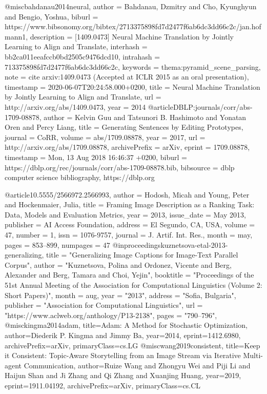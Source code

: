 @misc{bahdanau2014neural,
  author = {Bahdanau, Dzmitry and Cho, Kyunghyun and Bengio, Yoshua},
  biburl = {https://www.bibsonomy.org/bibtex/2713375898fd7d2477f6ab6dc3dd66c2c/jan.hofmann1},
  description = {[1409.0473] Neural Machine Translation by Jointly Learning to Align and Translate},
  interhash = {bb2ca011eeafccb0bd2505c9476dcd10},
  intrahash = {713375898fd7d2477f6ab6dc3dd66c2c},
  keywords = {thema:pyramid_scene_parsing},
  note = {cite arxiv:1409.0473 (Accepted at ICLR 2015 as an oral presentation)},
  timestamp = {2020-06-07T20:24:58.000+0200},
  title = {Neural Machine Translation by Jointly Learning to Align and Translate},
  url = {http://arxiv.org/abs/1409.0473},
  year = 2014
}
@article{DBLP:journals/corr/abs-1709-08878,
  author    = {Kelvin Guu and
               Tatsunori B. Hashimoto and
               Yonatan Oren and
               Percy Liang},
  title     = {Generating Sentences by Editing Prototypes},
  journal   = {CoRR},
  volume    = {abs/1709.08878},
  year      = {2017},
  url       = {http://arxiv.org/abs/1709.08878},
  archivePrefix = {arXiv},
  eprint    = {1709.08878},
  timestamp = {Mon, 13 Aug 2018 16:46:37 +0200},
  biburl    = {https://dblp.org/rec/journals/corr/abs-1709-08878.bib},
  bibsource = {dblp computer science bibliography, https://dblp.org}
}

@article{10.5555/2566972.2566993,
author = {Hodosh, Micah and Young, Peter and Hockenmaier, Julia},
title = {Framing Image Description as a Ranking Task: Data, Models and Evaluation Metrics},
year = {2013},
issue_date = {May 2013},
publisher = {AI Access Foundation},
address = {El Segundo, CA, USA},
volume = {47},
number = {1},
issn = {1076-9757},
journal = {J. Artif. Int. Res.},
month = may,
pages = {853–899},
numpages = {47}
}
@inproceedings{kuznetsova-etal-2013-generalizing,
    title = "Generalizing Image Captions for Image-Text Parallel Corpus",
    author = "Kuznetsova, Polina  and
      Ordonez, Vicente  and
      Berg, Alexander  and
      Berg, Tamara  and
      Choi, Yejin",
    booktitle = "Proceedings of the 51st Annual Meeting of the Association for Computational Linguistics (Volume 2: Short Papers)",
    month = aug,
    year = "2013",
    address = "Sofia, Bulgaria",
    publisher = "Association for Computational Linguistics",
    url = "https://www.aclweb.org/anthology/P13-2138",
    pages = "790--796",
}
@misc{kingma2014adam,
    title={Adam: A Method for Stochastic Optimization},
    author={Diederik P. Kingma and Jimmy Ba},
    year={2014},
    eprint={1412.6980},
    archivePrefix={arXiv},
    primaryClass={cs.LG}
}
@misc{wang2019consistent,
    title={Keep it Consistent: Topic-Aware Storytelling from an Image Stream via Iterative Multi-agent Communication},
    author={Ruize Wang and Zhongyu Wei and Piji Li and Haijun Shan and Ji Zhang and Qi Zhang and Xuanjing Huang},
    year={2019},
    eprint={1911.04192},
    archivePrefix={arXiv},
    primaryClass={cs.CL}
}

